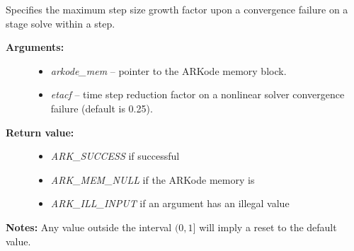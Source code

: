 \documentclass[letterpaper,10pt,english]{sphinxmanual}
\begin{document}
\begin{fulllineitems}
\label{c_interface/User_callable:ARKodeSetMaxCFailGrowth}
Specifies the maximum step size growth factor upon a convergence
failure on a stage solve within a step.
\begin{description}
\item[{\textbf{Arguments:}}] \leavevmode\begin{itemize}
\item {} 
\emph{arkode\_mem} -- pointer to the ARKode memory block.

\item {} 
\emph{etacf} -- time step reduction factor on a nonlinear solver
convergence failure (default is 0.25).

\end{itemize}

\item[{\textbf{Return value:}}] \leavevmode\begin{itemize}
\item {} 
\emph{ARK\_SUCCESS} if successful

\item {} 
\emph{ARK\_MEM\_NULL} if the ARKode memory is 

\item {} 
\emph{ARK\_ILL\_INPUT} if an argument has an illegal value

\end{itemize}

\end{description}

\textbf{Notes:} Any value outside the interval $(0,1]$ will imply a reset to the default value.

\end{fulllineitems}

\end{document}
